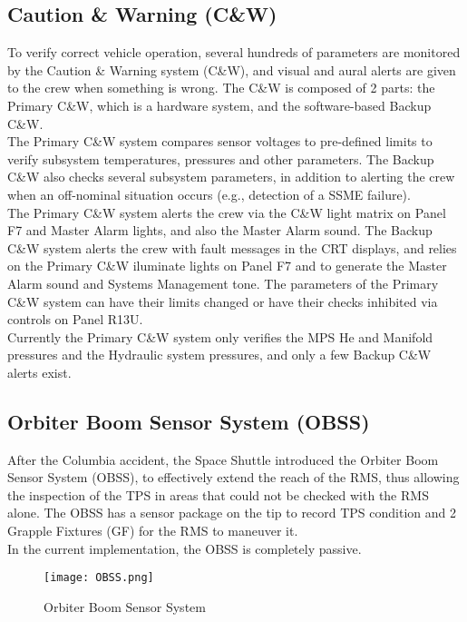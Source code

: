 \documentclass[Space_Shuttle_Vessel_Manual.tex]{subfiles}
\begin{document}
\begin{multicols*}{2}
\subsection{Caution \& Warning (C\&W)}
To verify correct vehicle operation, several hundreds of parameters are monitored by the Caution \& Warning system (C\&W), and visual and aural alerts are given to the crew when something is wrong. The C\&W is composed of 2 parts: the Primary C\&W, which is a hardware system, and the software-based Backup C\&W.\\
The Primary C\&W system compares sensor voltages to pre-defined limits to verify subsystem temperatures, pressures and other parameters. The Backup C\&W also checks several subsystem parameters, in addition to alerting the crew when an off-nominal situation occurs (e.g., detection of a SSME failure).\\
The Primary C\&W system alerts the crew via the C\&W light matrix on Panel F7 and Master Alarm lights, and also the Master Alarm sound. The Backup C\&W system alerts the crew with fault messages in the CRT displays, and relies on the Primary C\&W iluminate lights on Panel F7 and to generate the Master Alarm sound and Systems Management tone. The parameters of the Primary C\&W system can have their limits changed or have their checks inhibited via controls on Panel R13U.\\
Currently the Primary C\&W system only verifies the MPS He and Manifold pressures and the Hydraulic system pressures, and only a few Backup C\&W alerts exist.
\end{multicols*}



\begin{multicols*}{2}
\subsection{Orbiter Boom Sensor System (OBSS)}
After the Columbia accident, the Space Shuttle introduced the Orbiter Boom Sensor System (OBSS), to effectively extend the reach of the RMS, thus allowing the inspection of the TPS in areas that could not be checked with the RMS alone.
The OBSS has a sensor package on the tip to record TPS condition and 2 Grapple Fixtures (GF) for the RMS to maneuver it.\\
In the current implementation, the OBSS is completely passive.
\begin{figure}[H]
  \texttt{[image: OBSS.png]}
  \caption{Orbiter Boom Sensor System}
  \label{fig:OBSS}
\end{figure}
\end{multicols*}
\end{document}
